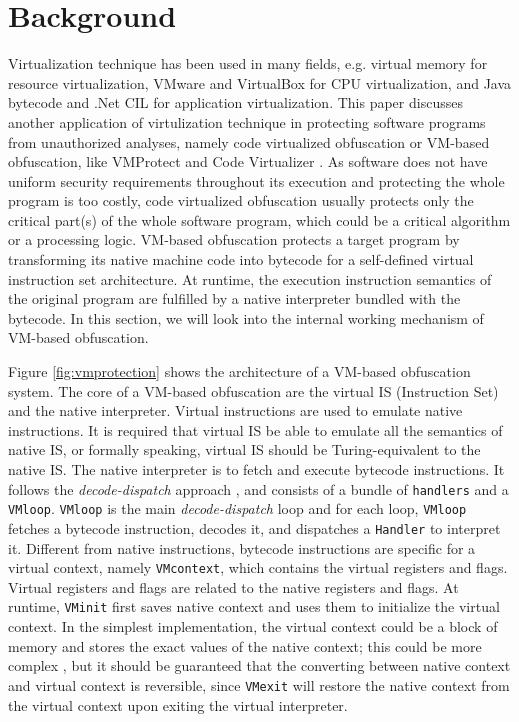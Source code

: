 \section{Background}\label{sec:background}
Virtualization technique has been used in many fields, e.g.
virtual memory for resource virtualization, VMware and VirtualBox for CPU virtualization,
and Java bytecode and .Net CIL for application virtualization.
This paper discusses another application of virtulization technique
in protecting software programs from unauthorized analyses,
namely code virtualized obfuscation or VM-based obfuscation,
like VMProtect \cite{vmp} and Code Virtualizer \cite{cv}.
As software does not have uniform security requirements throughout its execution \cite{geneiatakis2012adaptive}
and protecting the whole program is too costly,
code virtualized obfuscation usually protects only the critical part(s) of the whole software program,
which could be a critical algorithm or a processing logic.
VM-based obfuscation protects a target program by transforming its native machine code into bytecode
for a self-defined virtual instruction set architecture.
At runtime, the execution instruction semantics of the original program are fulfilled
by a native interpreter bundled with the bytecode.
In this section, we will look into the internal working mechanism of VM-based obfuscation.

Figure \ref{fig:vmprotection} shows the architecture of a VM-based obfuscation system.
The core of a VM-based obfuscation are the virtual IS (Instruction Set) and the native interpreter.
Virtual instructions are used to emulate native instructions.
It is required that virtual IS be able to emulate all the semantics of native IS,
or formally speaking, virtual IS should be Turing-equivalent to the native IS.
The native interpreter is to fetch and execute bytecode instructions.
It follows the \textit{decode-dispatch} approach \cite{ghosh2012replacement},
and consists of a bundle of \texttt{handlers} and a \texttt{VMloop}.
\texttt{VMloop} is the main \textit{decode-dispatch} loop and for each loop,
\texttt{VMloop} fetches a bytecode instruction, decodes it, and dispatches a \texttt{Handler} to interpret it.
Different from native instructions, bytecode instructions are specific for a virtual context,
namely \texttt{VMcontext}, which contains the virtual registers and flags.
Virtual registers and flags are related to the native registers and flags.
At runtime, \texttt{VMinit} first saves native context and uses them to initialize the virtual context.
In the simplest implementation, the virtual context could be a block of memory
and stores the exact values of the native context;
this could be more complex \cite{falliere2009inside},
but it should be guaranteed that the converting between native context and virtual context is reversible,
since \texttt{VMexit} will restore the native context from the virtual context upon exiting the virtual interpreter.


